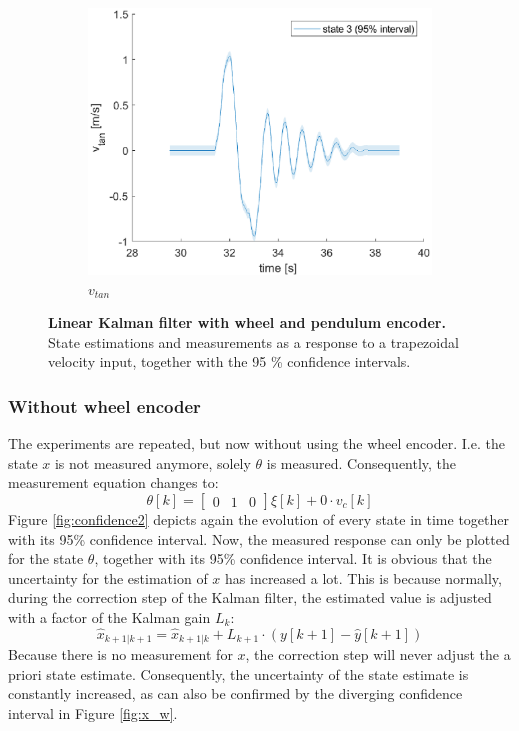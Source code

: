 \documentclass[a4paper,kul]{kulakarticle} %
\begin{document}
\begin{figure}[htp!]
	\begin{subfigure}[b]{0.48\textwidth}
		\centering 
		\includegraphics[width=\textwidth]{state3.eps}
		\caption{$v_{tan}$}
	\end{subfigure}
	\caption{\textbf{Linear Kalman filter with wheel and pendulum encoder.} State estimations and measurements as a response to a trapezoidal velocity input, together with the 95 \% confidence intervals.} 
	\label{fig:confidence1}
\end{figure}




\subsubsection*{Without wheel encoder}
The experiments are repeated, but now without using the wheel encoder. I.e. the state $x$ is not measured anymore, solely $\theta$ is measured. Consequently, the measurement equation changes to:
\begin{equation}
		\theta[k] = \begin{bmatrix}
		0&1&0
	\end{bmatrix}\xi[k] + 0 \cdot v_c[k]
\end{equation}
Figure \ref{fig:confidence2} depicts again the evolution of every state in time together with its 95\% confidence interval. Now, the measured response can only be plotted for the state $\theta$, together with its 95\% confidence interval. It is obvious that the uncertainty for the estimation of $x$ has increased a lot. This is because normally, during the correction step of the Kalman filter, the estimated value is adjusted with a factor of the Kalman gain $L_k$:
\begin{equation}
	\hat{x}_{k+1|k+1} = \hat{x}_{k+1|k} + L_{k+1} \cdot \left(y[k+1] - \hat{y}[k+1]\right)
\end{equation}
Because there is no measurement for $x$, the correction step will never adjust the a priori state estimate. Consequently, the uncertainty of the state estimate is constantly increased, as can also be confirmed by the diverging confidence interval in Figure \ref{fig:x_w}. 
\end{document}
